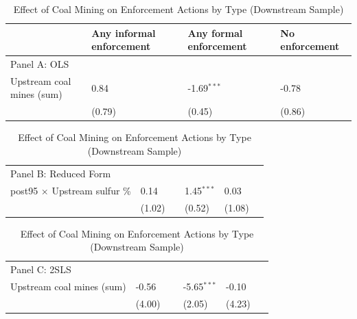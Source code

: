 \begin{table}[htbp]
\raggedright
\begin{minipage}{14.5cm}
\caption{\label{tab:h3_inf_formal_d12} Effect of Coal Mining on Enforcement Actions by Type (Downstream Sample)}
\end{minipage}
\small
{\setlength{\tabcolsep}{4pt}%
\begin{tabular}{p{5.5cm}>{\raggedleft\arraybackslash}p{3cm}>{\raggedleft\arraybackslash}p{3cm}>{\raggedleft\arraybackslash}p{3cm}}
\hline\hline
 & Any informal enforcement & Any formal enforcement & No enforcement \\
\hline
\multicolumn{4}{l}{Panel A: OLS} \\
Upstream coal mines (sum) & \phantom{(}\phantom{-}0.84$^{\phantom{*}\phantom{*}\phantom{*}}$ & \phantom{(}-1.69$^{***}$ & \phantom{(}-0.78$^{\phantom{*}\phantom{*}\phantom{*}}$ \\
 & (\phantom{-}0.79)\phantom{$^{***}$} & (\phantom{-}0.45)\phantom{$^{***}$} & (\phantom{-}0.86)\phantom{$^{***}$} \\
\end{tabular}
\begin{tabular}{p{5.5cm}>{\raggedleft\arraybackslash}p{3cm}>{\raggedleft\arraybackslash}p{3cm}>{\raggedleft\arraybackslash}p{3cm}}
\hline
\multicolumn{4}{l}{Panel B: Reduced Form} \\
post95 $\times$ Upstream sulfur \% & \phantom{(}\phantom{-}0.14$^{\phantom{*}\phantom{*}\phantom{*}}$ & \phantom{(}\phantom{-}1.45$^{***}$ & \phantom{(}\phantom{-}0.03$^{\phantom{*}\phantom{*}\phantom{*}}$ \\
 & (\phantom{-}1.02)\phantom{$^{***}$} & (\phantom{-}0.52)\phantom{$^{***}$} & (\phantom{-}1.08)\phantom{$^{***}$} \\
\end{tabular}
\begin{tabular}{p{5.5cm}>{\raggedleft\arraybackslash}p{3cm}>{\raggedleft\arraybackslash}p{3cm}>{\raggedleft\arraybackslash}p{3cm}}
\hline
\multicolumn{4}{l}{Panel C: 2SLS} \\
Upstream coal mines (sum) & \phantom{(}-0.56$^{\phantom{*}\phantom{*}\phantom{*}}$ & \phantom{(}-5.65$^{***}$ & \phantom{(}-0.10$^{\phantom{*}\phantom{*}\phantom{*}}$ \\
 & (\phantom{-}4.00)\phantom{$^{***}$} & (\phantom{-}2.05)\phantom{$^{***}$} & (\phantom{-}4.23)\phantom{$^{***}$} \\
\hline\hline
\end{tabular}
}
\begin{minipage}{14.5cm}

\end{minipage}
\end{table}
